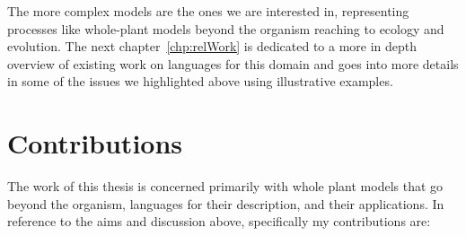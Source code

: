 The more complex models are the ones we are interested in, representing
processes like whole-plant models beyond the organism reaching to ecology and
evolution. The next chapter~\ref{chp:relWork} is dedicated to a more in depth
overview of existing work on languages for this domain and goes into more
details in some of the issues we highlighted above using illustrative examples.


\section{Contributions}
The work of this thesis is concerned primarily with whole plant models that go
beyond the organism, languages for their description, and their applications. In
reference to the aims and discussion above, specifically my contributions are:

